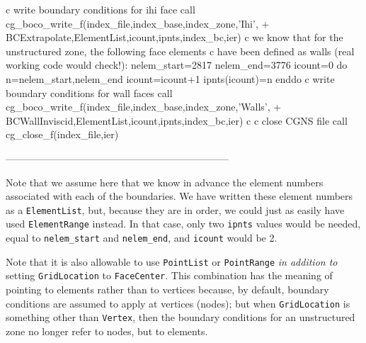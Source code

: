 \documentclass[12pt]{article}
\begin{document}
{\newline c  write boundary conditions for ihi face
\newline\indent      call cg\_boco\_write\_f(index\_file,index\_base,index\_zone,'Ihi',
\newline + \indent BCExtrapolate,ElementList,icount,ipnts,index\_bc,ier)
\newline c  we know that for the unstructured zone, the following face elements
\newline c  have been defined as walls (real working code would check!):
\newline\indent      nelem\_start=2817
\newline\indent      nelem\_end=3776
\newline\indent      icount=0
\newline\indent      do n=nelem\_start,nelem\_end
\newline\indent\indent        icount=icount+1
\newline\indent\indent        ipnts(icount)=n
\newline\indent      enddo
\newline c  write boundary conditions for wall faces
\newline\indent      call cg\_boco\_write\_f(index\_file,index\_base,index\_zone,'Walls',
\newline + \indent BCWallInviscid,ElementList,icount,ipnts,index\_bc,ier)
\newline c
\newline c  close CGNS file
\newline\indent      call cg\_close\_f(index\_file,ier)
}

--------------------------------------------------------------------

Note that we assume here that we know in advance the element numbers
associated with each of the boundaries.
We have written these element numbers as a {\tt ElementList}, but, because
they are in order, we could just as easily have used {\tt ElementRange}
instead.
In that case, only two {\tt ipnts} values would be needed, equal to
{\tt nelem\_start} and {\tt nelem\_end}, and {\tt icount} would be 2.

Note that it is also allowable to use {\tt PointList} or {\tt PointRange}
{\it in addition to} setting {\tt GridLocation} to {\tt FaceCenter}.
This combination has the meaning of pointing to elements rather than
to vertices because, by default,
boundary conditions are assumed to apply at vertices (nodes);
but when {\tt GridLocation} is something other than {\tt Vertex},
then the boundary conditions for an unstructured
zone no longer refer to nodes, but to elements.
\end{document}
